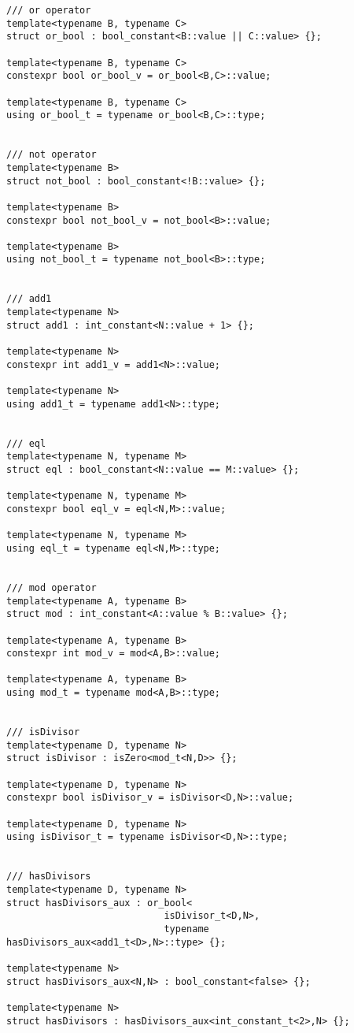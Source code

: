 \documentclass[11pt]{article}
\begin{document}
\begin{verbatim}
/// or operator
template<typename B, typename C>
struct or_bool : bool_constant<B::value || C::value> {};

template<typename B, typename C>
constexpr bool or_bool_v = or_bool<B,C>::value;

template<typename B, typename C>
using or_bool_t = typename or_bool<B,C>::type;


/// not operator
template<typename B>
struct not_bool : bool_constant<!B::value> {};

template<typename B>
constexpr bool not_bool_v = not_bool<B>::value;

template<typename B>
using not_bool_t = typename not_bool<B>::type;


/// add1
template<typename N>
struct add1 : int_constant<N::value + 1> {};

template<typename N>
constexpr int add1_v = add1<N>::value;

template<typename N>
using add1_t = typename add1<N>::type;


/// eql
template<typename N, typename M>
struct eql : bool_constant<N::value == M::value> {};

template<typename N, typename M>
constexpr bool eql_v = eql<N,M>::value;

template<typename N, typename M>
using eql_t = typename eql<N,M>::type;


/// mod operator
template<typename A, typename B>
struct mod : int_constant<A::value % B::value> {};

template<typename A, typename B>
constexpr int mod_v = mod<A,B>::value;

template<typename A, typename B>
using mod_t = typename mod<A,B>::type;


/// isDivisor
template<typename D, typename N>
struct isDivisor : isZero<mod_t<N,D>> {};

template<typename D, typename N>
constexpr bool isDivisor_v = isDivisor<D,N>::value;

template<typename D, typename N>
using isDivisor_t = typename isDivisor<D,N>::type;


/// hasDivisors
template<typename D, typename N>
struct hasDivisors_aux : or_bool<
							isDivisor_t<D,N>,
							typename hasDivisors_aux<add1_t<D>,N>::type> {};

template<typename N>
struct hasDivisors_aux<N,N> : bool_constant<false> {};

template<typename N>
struct hasDivisors : hasDivisors_aux<int_constant_t<2>,N> {};


\end{verbatim}
\end{document}
